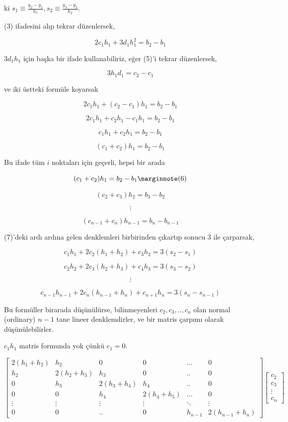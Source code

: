 \documentclass[12pt,fleqn]{article}\usepackage{../../common}
\begin{document}
ki $s_1 \equiv \frac{y_2 - y_1}{h_1}, s_2 \equiv \frac{y_3 - y_2}{h_2}$. 

(3) ifadesini alıp tekrar düzenlersek, 

$$  2c_1h_1 + 3d_1h_1^2  = b_2 - b_1$$

$3d_1h_1$ için başka bir ifade kullanabiliriz, eğer (5)'i tekrar
düzenlersek,

$$ 3h_1d_1 = c_2 - c_1$$

ve iki üstteki formüle koyarsak

$$  2c_1h_1 + (c_2 - c_1)h_1  = b_2 - b_1$$

$$  2c_1h_1 + c_2h_1 - c_1h_1  = b_2 - b_1$$

$$  c_1h_1 + c_2h_1  = b_2 - b_1$$

$$  (c_1 + c_2) h_1  = b_2 - b_1$$

Bu ifade tüm $i$ noktaları için geçerli, hepsi bir arada

$$  (c_1 + c_2) h_1  = b_2 - b_1 
\mlabel{6}$$

$$  (c_2 + c_3) h_2  = b_3 - b_2$$

$$ \vdots $$

$$  (c_{n-1} + c_n) h_{n-1}  = b_n - b_{n-1}$$

(7)'deki ardı ardına gelen denklemleri birbirinden çıkartıp sonucu 3 ile
çarparsak, 

$$ c_1h_1 + 2c_2(h_1 + h_2) + c_3h_2 = 3(s_2 - s_1) $$

$$ c_2h_2 + 2c_3(h_2 + h_3) + c_4h_3 = 3(s_3 - s_2) $$

$$ \vdots $$

$$ c_{n-1}h_{n-1} + 2c_n(h_{n-1} + h_{n}) + c_{n+1}h_n = 3(s_n - s_{n-1}) $$

Bu formüller birarada düşünülürse, bilinmeyenleri $c_2,c_3,..,c_n$ olan
normal (ordinary) $n-1$ tane lineer denklemdirler, ve bir matris çarpımı
olarak düşünülebilirler. 

$c_1h_1$ matris formunda yok çünkü $c_1=0$. 

$$ 
\left[\begin{array}{cccccc}
2(h_1+h_2) & h_2 & 0 & 0 & ... & 0 \\
h_2 & 2(h_2+h_3) & h_3 & 0 & .. & 0  \\
0 & h_3 & 2(h_3+h_4) & h_4 & .. & 0 \\
0 & 0 & h_4 & 2(h_4+h_5) & ... & 0 \\
\vdots & \vdots & \vdots & \vdots & \ddots & \vdots  \\
0 & 0 & .. & 0 & h_{n-1} & 2(h_{n-1}+h_n) 
\end{array}\right]
\left[\begin{array}{r}
c_2 \\ c_3 \\ \vdots \\ c_n
\end{array}\right]
 $$
\end{document}
